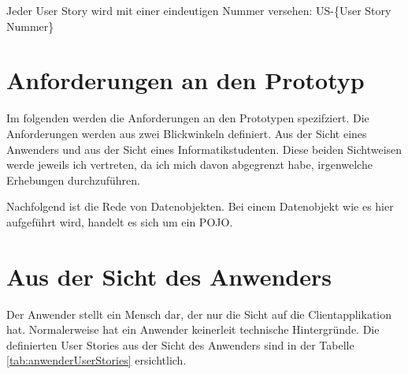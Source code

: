 \documentclass[abstracton, listof=totocnumbered,
bibliography=totocnumbered]{scrreprt}
\begin{document}
  Jeder User Story wird mit einer eindeutigen Nummer versehen: US-\{User Story
  Nummer\}
  
  \section{Anforderungen an den Prototyp}
  
  Im folgenden werden die Anforderungen an den Prototypen spezifziert. Die
  Anforderungen werden aus zwei Blickwinkeln definiert. Aus der Sicht eines
  Anwenders und aus der Sicht eines Informatikstudenten. Diese beiden
  Sichtweisen werde jeweils ich vertreten, da ich mich davon abgegrenzt habe,
  irgenwelche Erhebungen durchzuführen.
  
  Nachfolgend ist die Rede von Datenobjekten. Bei einem Datenobjekt wie es hier
  aufgeführt wird, handelt es sich um ein \ac{POJO}. 
  
  \newpage
  
  \section{Aus der Sicht des Anwenders}
  
  Der Anwender stellt ein Mensch dar, der nur die Sicht auf die
  Clientapplikation hat. Normalerweise hat ein Anwender keinerleit technische
  Hintergründe. Die definierten User Stories aus der Sicht des Anwenders sind in
  der Tabelle \ref{tab:anwenderUserStories} ersichtlich.
  \newline
  
\end{document}
